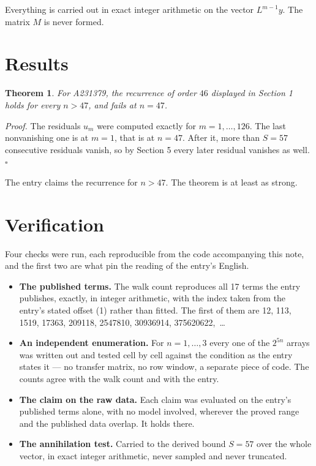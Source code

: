 \documentclass[11pt]{article}
\newtheorem{theorem}{Theorem}
\theoremstyle{definition}
\begin{document}
Everything is carried out in exact integer arithmetic on the vector $L^{m-1}y$. The matrix $M$ is never formed.

\section{Results}

\begin{theorem} For A231379, the recurrence of order $46$ displayed in Section 1 holds for every $n > 47$, and fails at $n = 47$.\end{theorem}

{\itshape Proof.} The residuals $u_m$ were computed exactly for $m = 1,\dots,126$. The last nonvanishing one is at $m = 1$, that is at $n = 47$. After it, more than $S = 57$ consecutive residuals vanish, so by Section 5 every later residual vanishes as well. $\square$

The entry claims the recurrence for $n > 47$. The theorem is at least as strong.

\section{Verification}

Four checks were run, each reproducible from the code accompanying this note, and the first two are what pin the reading of the entry's English.

\begin{itemize}

\item {\bfseries The published terms.} The walk count reproduces all 17 terms the entry publishes, exactly, in integer arithmetic, with the index taken from the entry's stated offset (1) rather than fitted. The first of them are 12, 113, 1519, 17363, 209118, 2547810, 30936914, 375620622,~\dots

\item {\bfseries An independent enumeration.} For $n = 1,\dots,3$ every one of the $2^{5n}$ arrays was written out and tested cell by cell against the condition as the entry states it --- no transfer matrix, no row window, a separate piece of code. The counts agree with the walk count and with the entry.

\item {\bfseries The claim on the raw data.} Each claim was evaluated on the entry's published terms alone, with no model involved, wherever the proved range and the published data overlap. It holds there.

\item {\bfseries The annihilation test.} Carried to the derived bound $S = 57$ over the whole vector, in exact integer arithmetic, never sampled and never truncated.

\end{itemize}
\end{document}
